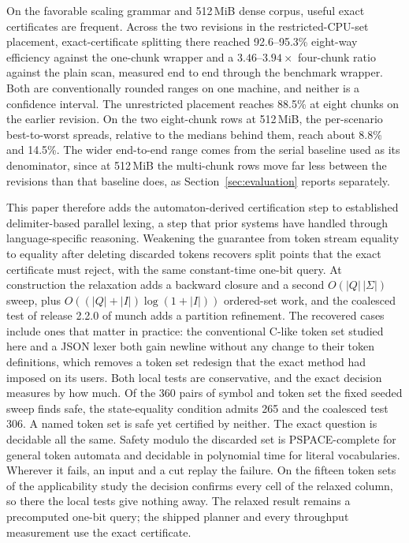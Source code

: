 \documentclass[11pt,a4paper]{article}
\theoremstyle{definition}
\theoremstyle{plain}
\begin{document}
On the favorable scaling grammar and 512\,MiB dense corpus, useful exact certificates are frequent. Across the two
revisions in the restricted-CPU-set placement, exact-certificate splitting there reached 92.6--95.3\% eight-way
efficiency against the one-chunk wrapper and a $3.46$--$3.94\times$ four-chunk ratio against the plain scan, measured
end to end through the benchmark wrapper. Both are conventionally rounded ranges on one machine, and neither is a
confidence interval. The unrestricted placement reaches 88.5\% at eight chunks on the earlier revision. On the two
eight-chunk rows at 512\,MiB, the per-scenario best-to-worst spreads, relative to the medians behind them, reach about
8.8\% and 14.5\%. The wider end-to-end range comes from the serial baseline used as its denominator, since at 512\,MiB
the multi-chunk rows move far less between the revisions than that baseline does, as Section~\ref{sec:evaluation}
reports separately.

This paper therefore adds the automaton-derived certification step to established delimiter-based parallel lexing, a
step that prior systems have handled through language-specific reasoning. Weakening the guarantee from token stream
equality to equality after deleting discarded tokens recovers split points that the exact certificate must reject, with
the same constant-time one-bit query. At construction the relaxation adds a backward closure and a second
$O(|Q|\,|\Sigma|)$ sweep, plus $O((|Q|+|I|)\log(1+|I|))$ ordered-set work, and the coalesced test of release 2.2.0 of
munch adds a partition refinement. The recovered cases include ones that matter in practice: the conventional C-like
token set studied here and a JSON lexer both gain newline without any change to their token definitions, which removes a
token set redesign that the exact method had imposed on its users. Both local tests are conservative, and the exact
decision measures by how much. Of the 360 pairs of symbol and token set the fixed seeded sweep finds safe, the
state-equality condition admits 265 and the coalesced test 306. A named token set is safe yet certified by neither. The
exact question is decidable all the same. Safety modulo the discarded set is PSPACE-complete for general token automata
and decidable in polynomial time for literal vocabularies. Wherever it fails, an input and a cut replay the failure. On
the fifteen token sets of the applicability study the decision confirms every cell of the relaxed column, so there the
local tests give nothing away. The relaxed result remains a precomputed one-bit query; the shipped planner and every
throughput measurement use the exact certificate.
\end{document}
